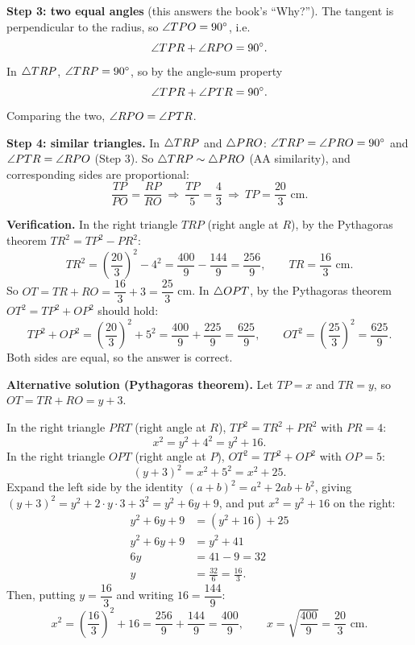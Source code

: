 \textbf{Step 3: two equal angles} (this answers the book's ``Why?''). The tangent is perpendicular to the radius, so $\angle TPO=90^\circ$, i.e.
\[\angle TPR+\angle RPO=90^\circ.\]
In $\triangle TRP$, $\angle TRP=90^\circ$, so by the angle-sum property
\[\angle TPR+\angle PTR=90^\circ.\]
Comparing the two, $\angle RPO=\angle PTR$.

\textbf{Step 4: similar triangles.} In $\triangle TRP$ and $\triangle PRO$: $\angle TRP=\angle PRO=90^\circ$ and $\angle PTR=\angle RPO$ (Step 3). So $\triangle TRP\sim\triangle PRO$ (AA similarity), and corresponding sides are proportional:
\[\frac{TP}{PO}=\frac{RP}{RO}\ \Rightarrow\ \frac{TP}{5}=\frac{4}{3}\ \Rightarrow\ TP=\frac{20}{3}\text{ cm}.\]

\textbf{Verification.} In the right triangle $TRP$ (right angle at $R$), by the Pythagoras theorem $TR^2=TP^2-PR^2$:
\[TR^2=\left(\frac{20}{3}\right)^2-4^2=\frac{400}{9}-\frac{144}{9}=\frac{256}{9},\qquad TR=\frac{16}{3}\text{ cm}.\]
So $OT=TR+RO=\dfrac{16}{3}+3=\dfrac{25}{3}$ cm. In $\triangle OPT$, by the Pythagoras theorem $OT^2=TP^2+OP^2$ should hold:
\[TP^2+OP^2=\left(\frac{20}{3}\right)^2+5^2=\frac{400}{9}+\frac{225}{9}=\frac{625}{9},\qquad OT^2=\left(\frac{25}{3}\right)^2=\frac{625}{9}.\]
Both sides are equal, so the answer is correct.


\textbf{Alternative solution (Pythagoras theorem).} Let $TP=x$ and $TR=y$, so $OT=TR+RO=y+3$.

In the right triangle $PRT$ (right angle at $R$), $TP^2=TR^2+PR^2$ with $PR=4$:
\[x^2=y^2+4^2=y^2+16.\]
In the right triangle $OPT$ (right angle at $P$), $OT^2=TP^2+OP^2$ with $OP=5$:
\[(y+3)^2=x^2+5^2=x^2+25.\]
Expand the left side by the identity $(a+b)^2=a^2+2ab+b^2$, giving $(y+3)^2=y^2+2\cdot y\cdot3+3^2=y^2+6y+9$, and put $x^2=y^2+16$ on the right:
\begin{align*}
y^2+6y+9&=(y^2+16)+25\\
y^2+6y+9&=y^2+41\\
6y&=41-9=32\\
y&=\frac{32}{6}=\frac{16}{3}.
\end{align*}
Then, putting $y=\dfrac{16}{3}$ and writing $16=\dfrac{144}{9}$:
\[x^2=\left(\frac{16}{3}\right)^2+16=\frac{256}{9}+\frac{144}{9}=\frac{400}{9},\qquad x=\sqrt{\frac{400}{9}}=\frac{20}{3}\text{ cm}.\]
